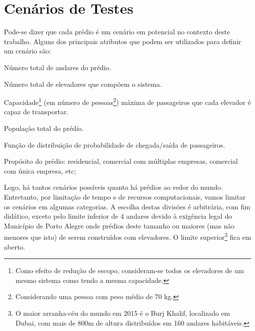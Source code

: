 \section{Cenários de Testes}

Pode-se dizer que cada prédio é um cenário em potencial no contexto deste trabalho. Alguns dos principais atributos que podem ser utilizados para definir um cenário são:

\begin{description}[leftmargin=!,labelwidth=\widthof{\bfseries Propósito}]
  \item[N]
  Número total de andares do prédio.
  \item[M]
  Número total de elevadores que compõem o sistema.
  \item[K]
  Capacidade\footnote{Como efeito de redução de escopo, consideram-se todos os
    elevadores de um mesmo sistema como tendo a mesma capacidade.} (em número de
  pessoas\footnote{Considerando uma pessoa com peso médio de 70 kg.}) máxima de passageiros que cada elevador é capaz de transportar.
  \item[P]
  População total do prédio.
  \item[F]
  Função de distribuição de probabilidade de chegada/saída de passageiros.
  \item[Propósito]
  Propósito do prédio: residencial, comercial com múltiplas empresas, comercial com única empresa, etc;
\end{description}

Logo, há tantos cenários possíveis quanto há prédios ao redor do mundo.
Entretanto, por limitação de tempo e de recursos computacionais, vamos limitar
os cenários em algumas categorias. A escolha destas divisões é arbitrária, com
fim didático, exceto pelo limite inferior de 4 andares devido à exigência legal
do Município de Porto Alegre onde prédios deste tamanho ou maiores (mas não
menores que isto) de serem construídos com elevadores. O limite
superior\footnote{O maior arranha-céu do mundo em 2015 é o Burj Khalif,
  localizado em Dubai, com mais de 800m de altura distribuídos em 160 andares habitáveis.} fica em aberto.


